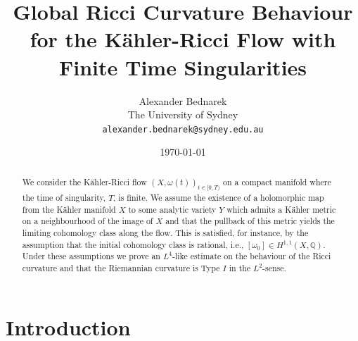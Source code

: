 \documentclass[12pt]{article}
\title{Global Ricci Curvature Behaviour for the K\"ahler-Ricci Flow with Finite Time Singularities}
\author{Alexander Bednarek\\The University of Sydney\\\texttt{alexander.bednarek@sydney.edu.au}}
\date{\today}
\numberwithin{equation}{section}
\newcommand{\Q}{\mathbb{Q}}
\begin{document}
\maketitle

\begin{abstract}
\noindent We consider the K\"ahler-Ricci flow $(X, \omega(t))_{t \in [0,T)}$ on a compact manifold where the time of singularity, $T$, is finite. We assume the existence of a holomorphic map from the K\"ahler manifold $X$ to some analytic variety $Y$ which admits a K\"ahler metric on a neighbourhood of the image of $X$ and that the pullback of this metric yields the limiting cohomology class along the flow. This is satisfied, for instance, by the assumption that the initial cohomology class is rational, i.e., $[\omega_0] \in H^{1,1}(X,\Q)$. Under these assumptions we prove an $L^4$-like estimate on the behaviour of the Ricci curvature and that the Riemannian curvature is Type $I$ in the $L^2$-sense.
\end{abstract}

\section{Introduction}
\end{document}
